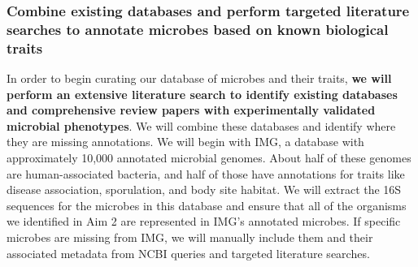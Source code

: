 \documentclass[12pt]{article}
\begin{document}

\subsubsection{Combine existing databases and perform targeted literature searches to annotate microbes based on known biological traits}\label{sec:set_curation}

In order to begin curating our database of microbes and their traits, 
\textbf{we will perform an extensive literature search
to identify existing databases and comprehensive review papers with experimentally 
validated microbial phenotypes}. We will combine these databases
and identify where they are missing annotations.
We will begin with IMG, a database with approximately 10,000 annotated microbial genomes. 
About half of these genomes are human-associated bacteria, 
and half of those have annotations for traits like disease 
association, sporulation, and body site habitat. 
We will extract the 16S sequences for the microbes in this database
and ensure that all of the organisms we identified in Aim 2
are represented in IMG's annotated microbes. If specific microbes are missing from IMG,
we will manually include them and their associated metadata from NCBI queries 
and targeted literature searches.
\end{document}
